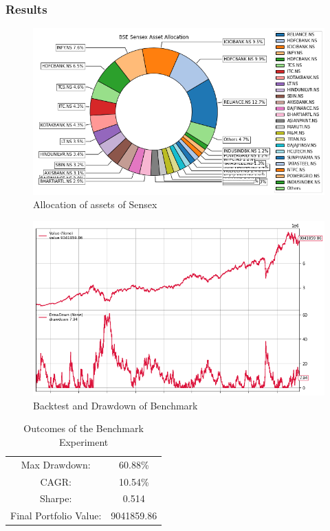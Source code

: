 \subsubsection{Results}
\begin{figure}[H]
\centering
   \includegraphics[width=1.0\textwidth]{Benchmark/allocation.png}
      \caption{Allocation of assets of Sensex}
       \label{benchmark_alloc}
\end{figure}
\begin{figure}[H]
\centering
   \includegraphics[width=1.0\textwidth]{Benchmark/backtest.png}
      \caption{Backtest and Drawdown of Benchmark}
       \label{benchmark}
\end{figure}


\begin{table}[H]
\centering
\begin{tabular}{|c | c|} 
 \hline
 Max Drawdown: &60.88\%\\
CAGR: &10.54\%\\
Sharpe: &0.514\\
Final Portfolio Value: &9041859.86\\
 \hline
\end{tabular}
\caption{Outcomes of the Benchmark Experiment}
\label{becnhmark outcome table}
\end{table}
